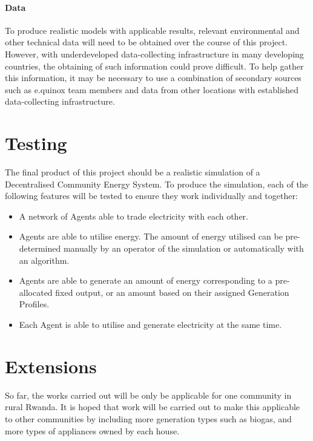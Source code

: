 \documentclass{article}
\begin{document}
\paragraph{Data}
To produce realistic models with applicable results, relevant environmental and other technical data will need to be obtained over the course of this project. However, with underdeveloped data-collecting infrastructure in many developing countries, the obtaining of such information could prove difficult. To help gather this information, it may be necessary to use a combination of secondary sources such as e.quinox team members and data from other locations with established data-collecting infrastructure.

\section{Testing}
The final product of this project should be a realistic simulation of a Decentralised Community Energy System. To produce the simulation, each of the following features will be tested to ensure they work individually and together:

\begin{itemize}
\item A network of Agents able to trade electricity with each other.
\item Agents are able to utilise energy. The amount of energy utilised can be pre-determined manually by an operator of the simulation or automatically with an algorithm.
\item Agents are able to generate an amount of energy corresponding to a pre-allocated fixed output, or an amount based on their assigned Generation Profiles.
\item Each Agent is able to utilise and generate electricity at the same time.
\end{itemize}

\section{Extensions}
So far, the works carried out will be only be applicable for one community in rural Rwanda. It is hoped that work will be carried out to make this applicable to other communities by including more generation types such as biogas, and more types of appliances owned by each house.
\end{document}
